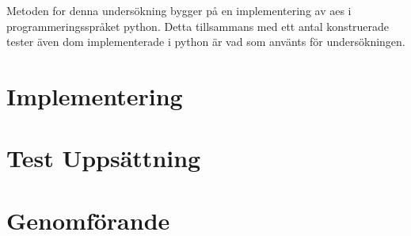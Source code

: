 Metoden for denna undersökning bygger på en implementering av \acrshort{aes} i programmeringsspråket
\gls{python}. Detta tillsammans med ett antal konstruerade tester även dom implementerade i
\gls{python} är vad som använts för undersökningen.

\section{Implementering}


\section{Test Uppsättning}


\section{Genomförande}